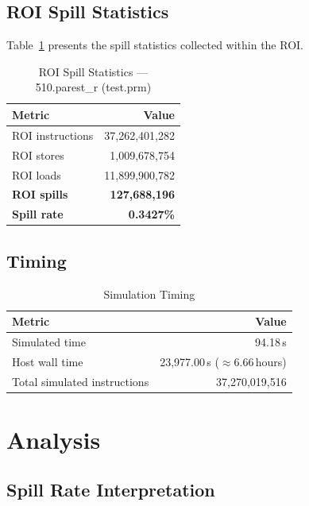\documentclass[conference]{IEEEtran}
\begin{document}
\subsection{ROI Spill Statistics}

Table~\ref{tab:roi} presents the spill statistics collected within
the ROI.

\begin{table}[H]
\centering
\caption{ROI Spill Statistics --- 510.parest\_r (test.prm)}
\label{tab:roi}
\begin{tabular}{lr}
\toprule
\textbf{Metric} & \textbf{Value} \\
\midrule
ROI instructions         & 37,262,401,282 \\
ROI stores               &  1,009,678,754 \\
ROI loads                & 11,899,900,782 \\
\midrule
\textbf{ROI spills}      & \textbf{127,688,196} \\
\textbf{Spill rate}      & \textbf{0.3427\%} \\
\bottomrule
\end{tabular}
\end{table}

\subsection{Timing}

\begin{table}[H]
\centering
\caption{Simulation Timing}
\label{tab:timing}
\begin{tabular}{lr}
\toprule
\textbf{Metric} & \textbf{Value} \\
\midrule
Simulated time           & 94.18\,s \\
Host wall time           & 23{,}977.00\,s ($\approx$6.66\,hours) \\
Total simulated instructions & 37,270,019,516 \\
\bottomrule
\end{tabular}
\end{table}

\section{Analysis}

\subsection{Spill Rate Interpretation}
\end{document}
